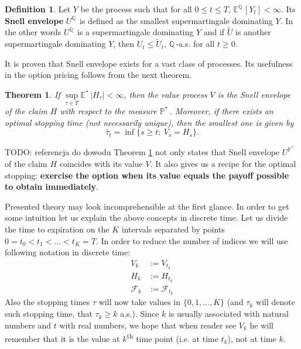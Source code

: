 \documentclass[a4paper,12pt, oneside]{book}
\newtheorem{thm}{Theorem}[chapter]
\theoremstyle{definition}
\newtheorem{mydef}{Definition}[chapter]
\theoremstyle{remark}
\def\E{{\mathbb{E}}}
\def\Q{{\mathbb{Q}}\,}
\def\Em{{\mathbb{E}^*}\,}
\def\Pm{{\mathbb{P}}^*\,}
\begin{document}
\begin{mydef}
 Let $Y$ be the process such that for all $0 \leq t \leq T$, $\E^{\Q}[Y_t] < \infty$. Its \textbf{Snell envelope} $U^{\Q}$ is defined as the smallest supermartingale dominating $Y$. In the other words $U^{\Q}$ is a supermartingale dominating $Y$ and if $\tilde{U}$ is another supermartingale dominating $Y$, then $U_t \leq \tilde{U}_t$, $\Q$-a.s. for all $t \geq 0$.
\end{mydef}
It is proven that Snell envelope exists for a vast class of processes. Its usefulness in the option pricing follows from the next theorem.
\begin{thm}
 \label{thm:snell}
 If $\sup\limits_{\tau \in T} \Em|H_{\tau}| < \infty$, then the value process $V$ is the Snell envelope of the claim $H$ with respect to the measure $\Pm$. Moreover, if there exists an optimal stopping time (not necessarily unique), then the smallest one is given by
 \begin{equation}
  \label{eq:optStop}
  \hat{\tau}_t = \inf\{ s \geq t:\ V_s = H_s \}.
 \end{equation}
\end{thm}
{\LARGE \color{red} TODO: referencja do dowodu}
Theorem \ref{thm:snell} not only states that Snell envelope $U^{\Pm}$ of the claim $H$ coincides with its value $V$. It also gives us a recipe for the optimal stopping: \textbf{exercise the option when its value equals the payoff possible to obtain immediately}.

Presented theory may look incomprehensible at the first glance. In order to get some intuition let us explain the above concepts in discrete time. Let us divide the time to expiration on the $K$ intervals separated by points $0 = t_0 < t_1 < \ldots < t_K = T$. In order to reduce the number of indices we will use following notation in discrete time:
\begin{align*}
 V_k &:= V_{t_k} \\
 H_k &:= H_{t_k} \\
 \mathcal{F}_k &:= \mathcal{F}_{t_k}
\end{align*}
Also the stopping times $\tau$ will now take values in $\{0, 1, \ldots, K\}$ (and $\tau_k$ will denote such stopping time, that $\tau_k \geq k$ a.s.).
Since $k$ is usually associated with natural numbers and $t$ with real numbers, we hope that when reader see $V_k$ he will remember that it is the value at $k$\textsuperscript{th} time point (i.e. at time $t_k$), not at time $k$.
\end{document}

